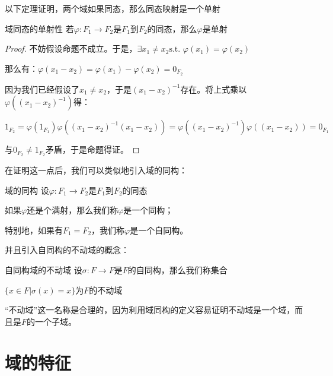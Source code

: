 \documentclass[12pt, a4paper, oneside, UTF8]{ctexbook}
\begin{document}
		以下定理证明，两个域如果同态，那么同态映射是一个单射
		\begin{them}{域同态的单射性}{}
			若$\varphi : F_1 \rightarrow F_2$是$F_1$到$F_2$的同态，那么$\varphi$是单射
		\end{them}
		\begin{proof}
			不妨假设命题不成立。于是，$\exists x_1 \neq x_2 \text{s.t. }\varphi(x_1)=\varphi(x_2)$
			
			那么有：$\varphi (x_1-x_2)=\varphi (x_1)-\varphi (x_2) = 0_{F_2}$
			
			因为我们已经假设了$x_1 \neq x_2$，于是$(x_1-x_2)^{-1}$存在。将上式乘以$\varphi\left((x_1-x_2)^{-1}\right)$得：
			
			$1_{F_2} = \varphi (1_{F_1}) \varphi\left((x_1-x_2)^{-1} (x_1-x_2)\right) = \varphi\left((x_1-x_2)^{-1}\right)\varphi\left((x_1-x_2)\right)=0_{F_1}$
			
			与$0_{F_2} \neq 1_{F_2}$矛盾，于是命题得证。
		\end{proof}
		在证明这一点后，我们可以类似地引入域的同构：
		\begin{defn}{域的同构}{}
			设$\varphi : F_1 \rightarrow F_2$是$F_1$到$F_2$的同态
			
			如果$\varphi$还是个满射，那么我们称$\varphi$是一个同构；
			
			特别地，如果有$F_1=F_2$，我们称$\varphi$是一个自同构。
		\end{defn}
		并且引入自同构的不动域的概念：
		\begin{defn}{自同构域的不动域}{}
			设$\sigma : F \rightarrow F$是$F$的自同构，那么我们称集合
			
			$\{x \in F | \sigma(x) = x\}$为$F$的不动域
		\end{defn}
		“不动域”这一名称是合理的，因为利用域同构的定义容易证明不动域是一个域，而且是$F$的一个子域。
	\section{域的特征}
\end{document}
